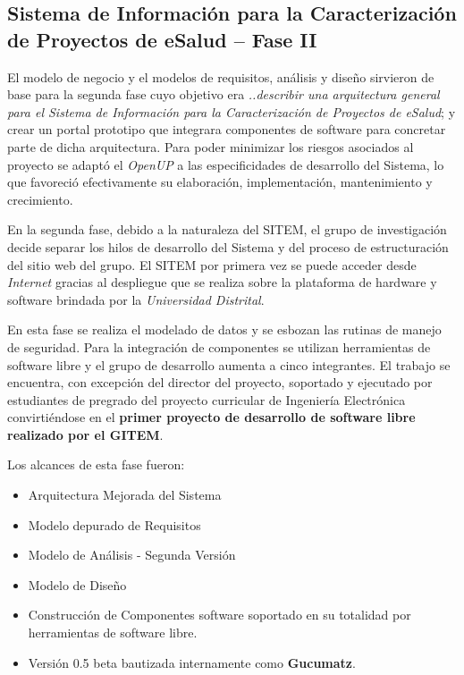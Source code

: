\subsection{Sistema de Información para la Caracterización de Proyectos de eSalud – Fase II}

El modelo de negocio y el modelos de requisitos, análisis y diseño sirvieron de base para la segunda fase cuyo objetivo era \textit{..describir una arquitectura general para el Sistema de Información para la Caracterización de Proyectos de eSalud}; y crear un portal prototipo que integrara componentes de software para concretar parte de dicha arquitectura. Para poder minimizar los riesgos asociados al proyecto se adaptó el \textit{OpenUP} a las especificidades de desarrollo del Sistema, lo que favoreció efectivamente su elaboración, implementación, mantenimiento y crecimiento.

En la segunda fase, debido a la naturaleza del SITEM, el grupo de investigación decide separar los hilos de desarrollo del Sistema y del proceso de estructuración del sitio web del grupo. El SITEM por primera vez se puede acceder desde \textit{Internet} gracias al despliegue que se realiza sobre la plataforma de hardware y software brindada por la \textit{Universidad Distrital}. 

En esta fase se realiza el modelado de datos y se esbozan las rutinas de manejo de seguridad. Para la integración de componentes se utilizan herramientas de software libre y el grupo de desarrollo aumenta a cinco integrantes. El trabajo se encuentra, con excepción del director del proyecto, soportado y ejecutado por estudiantes de pregrado del proyecto curricular de Ingeniería Electrónica convirtiéndose en el \textbf{primer proyecto de desarrollo de software libre realizado por el GITEM}.

Los alcances de esta fase fueron:
\begin{itemize}
\item Arquitectura Mejorada del Sistema
\item Modelo depurado de Requisitos
\item Modelo de Análisis - Segunda Versión
\item Modelo de Diseño
\item Construcción de Componentes software soportado en su totalidad por herramientas de software libre.
\item Versión 0.5 beta bautizada internamente como \textbf{Gucumatz}.
\end{itemize}


